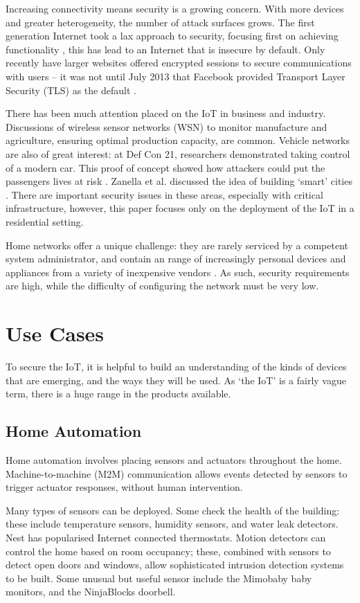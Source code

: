 \documentclass[10pt,journal,compsoc]{IEEEtran}
\begin{document}
Increasing connectivity means security is a growing concern. With more devices
and greater heterogeneity, the number of attack surfaces grows. The first
generation Internet took a lax approach to security, focusing first on
achieving functionality \cite{Bhimani1996}, this has lead to an Internet that
is insecure by default. Only recently have larger websites offered encrypted
sessions to secure communications with users -- it was not until July 2013 that
Facebook provided Transport Layer Security (TLS) as the default
\cite{Facebook2013}. 

There has been much attention placed on the IoT in business and industry.
Discussions of wireless sensor networks (WSN) to monitor manufacture and
agriculture, ensuring optimal production capacity, are common. Vehicle networks
are also of great interest: at Def Con 21, researchers demonstrated taking
control of a modern car. This proof of concept showed how attackers could put
the passengers lives at risk \cite{Illera2014}. Zanella et al. discussed the
idea of building `smart' cities \cite{Zanella2014}. There are important
security issues in these areas, especially with critical infrastructure,
however, this paper focuses only on the deployment of the IoT in a residential
setting. 

Home networks offer a unique challenge: they are rarely serviced by a competent
system administrator, and contain an range of increasingly personal devices and
appliances from a variety of inexpensive vendors \cite{Denning2013}. As such,
security requirements are high, while the difficulty of configuring the network
must be very low. 

\section{Use Cases}
To secure the IoT, it is helpful to build an understanding of the kinds of
devices that are emerging, and the ways they will be used. As `the IoT' is a
fairly vague term, there is a huge range in the products available.

\subsection{Home Automation}
Home automation involves placing sensors and actuators throughout the home.
Machine-to-machine (M2M) communication allows events detected by sensors
to trigger actuator responses, without human intervention. 

Many types of sensors can be deployed. Some check the health of the building:
these include temperature sensors, humidity sensors, and water leak detectors.
Nest has popularised Internet connected thermostats. Motion detectors can
control the home based on room occupancy; these, combined with sensors to
detect open doors and windows, allow sophisticated intrusion detection systems
to be built. Some unusual but useful sensor include the Mimobaby baby monitors,
and the NinjaBlocks doorbell.
\end{document}

